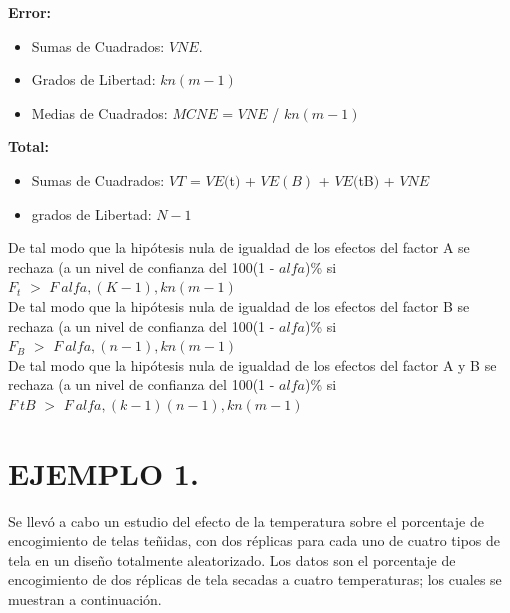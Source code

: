 \documentclass[12pt,letterpaper]{article}\usepackage[]{graphicx}\usepackage[]{color}
\begin{document}
\textbf{Error:}
\begin{itemize}
  \item Sumas de Cuadrados: $VNE$.
  \item Grados de Libertad: $kn(m - 1)$
  \item Medias de Cuadrados: $MCNE$ = $VNE$ / $kn(m - 1)$
\end{itemize}

\textbf{Total:}
\begin{itemize}
  \item Sumas de Cuadrados: $VT$ = $VE($t$)$ + $VE(B)$ + $VE($tB$)$ + $VNE$
  \item grados de Libertad: $N - 1$
\end{itemize}

De tal modo que la hip\'otesis nula de igualdad de los efectos del factor A se rechaza (a un nivel de confianza del 100(1 - $alfa$)\% si\\

$F_t$ $>$ $F_\ alfa,(K-1),kn(m-1)$\\

De tal modo que la hip\'otesis nula de igualdad de los efectos del factor B se rechaza (a un nivel de confianza del 100(1 - $alfa$)\% si\\

$F_B$ $>$ $F_\ alfa,(n-1),kn(m-1)$\\

De tal modo que la hip\'otesis nula de igualdad de los efectos del factor A y B se rechaza (a un nivel de confianza del 100(1 - $alfa$)\% si\\

$F_\ tB$ $>$ $F_\ alfa,(k-1)(n-1),kn(m-1)$\\

\section{EJEMPLO 1.}

Se llev\'o a cabo un estudio del efecto de la temperatura sobre el porcentaje de encogimiento de telas te\~nidas, con dos r\'eplicas para cada uno de cuatro tipos de tela en un dise\~no totalmente aleatorizado. Los datos son el porcentaje de encogimiento de dos r\'eplicas de tela secadas a cuatro temperaturas; los cuales se muestran a continuaci\'on. 
\end{document}
